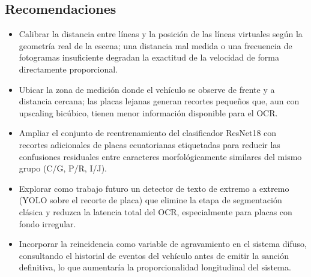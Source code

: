 \documentclass[11pt]{article}
\begin{document}
\subsection{Recomendaciones}
\begin{itemize}
    \item Calibrar la distancia entre líneas y la posición de las líneas virtuales
    según la geometría real de la escena; una distancia mal medida o una frecuencia de
    fotogramas insuficiente degradan la exactitud de la velocidad de forma directamente
    proporcional.
    \item Ubicar la zona de medición donde el vehículo se observe de frente y a
    distancia cercana; las placas lejanas generan recortes pequeños que, aun con
    upscaling bicúbico, tienen menor información disponible para el OCR.
    \item Ampliar el conjunto de reentrenamiento del clasificador ResNet18 con recortes
    adicionales de placas ecuatorianas etiquetadas para reducir las confusiones
    residuales entre caracteres morfológicamente similares del mismo grupo (C/G, P/R,
    I/J).
    \item Explorar como trabajo futuro un detector de texto de extremo a extremo (YOLO
    sobre el recorte de placa) que elimine la etapa de segmentación clásica y reduzca
    la latencia total del OCR, especialmente para placas con fondo irregular.
    \item Incorporar la reincidencia como variable de agravamiento en el sistema difuso,
    consultando el historial de eventos del vehículo antes de emitir la sanción
    definitiva, lo que aumentaría la proporcionalidad longitudinal del sistema.
\end{itemize}

\end{document}
